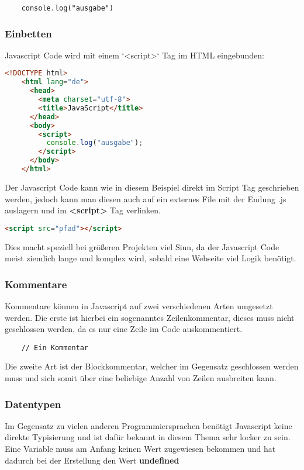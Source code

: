 \begin{lstlisting}
    console.log("ausgabe")
\end{lstlisting}

\subsubsection{Einbetten}
Javascript Code wird mit einem `<script>` Tag im HTML eingebunden:

\begin{lstlisting}[language=html]
    <!DOCTYPE html>
    <html lang="de">
      <head>
        <meta charset="utf-8">
        <title>JavaScript</title>
      </head>
      <body>
        <script>
          console.log("ausgabe");
        </script>
      </body>
    </html>
\end{lstlisting}

Der Javascript Code kann wie in diesem Beispiel direkt im Script Tag geschrieben werden, jedoch kann man diesen auch auf ein externes File mit der Endung .js auslagern und im \textbf{<script>} Tag verlinken. 

\begin{lstlisting}[language=html]
    <script src="pfad"></script>
\end{lstlisting}

Dies macht speziell bei größeren Projekten viel Sinn, da der Javascript Code meist ziemlich lange und komplex wird, sobald eine Webseite viel Logik benötigt.

\subsubsection{Kommentare}
Kommentare können in Javascript auf zwei verschiedenen Arten umgesetzt werden. Die erste ist hierbei ein sogenanntes Zeilenkommentar, dieses muss nicht geschlossen werden, da es nur eine Zeile im Code auskommentiert.

\begin{lstlisting}
    // Ein Kommentar
\end{lstlisting}

Die zweite Art ist der Blockkommentar, welcher im Gegensatz geschlossen werden muss und sich somit über eine beliebige Anzahl von Zeilen ausbreiten kann.


\subsubsection{Datentypen}
Im Gegensatz zu vielen anderen Programmiersprachen benötigt Javascript keine direkte Typisierung und ist dafür bekannt in diesem Thema sehr locker zu sein.
\newline
Eine Variable muss am Anfang keinen Wert zugewiesen bekommen und hat dadurch bei der Erstellung den Wert \textbf{undefined}

